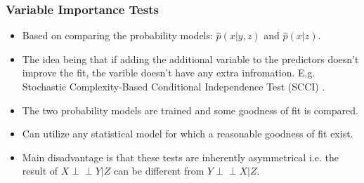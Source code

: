 \documentclass{beamer}
\def\ci{\perp\!\!\!\!\!\perp}
\begin{document}


\begin{frame}
	\frametitle{Variable Importance Tests}
	\begin{itemize}
		\setlength\itemsep{1em}
		\item Based on comparing the probability models: $\hat{p}(x |
			y, z) $ and $ \hat{p}(x | z) $. 
		\item The idea being that if adding the additional variable to
			the predictors doesn't improve the fit, the varible
			doesn't have any extra infromation.  E.g. Stochastic
			Complexity-Based Conditional Independence Test (SCCI)
			\footnotemark.
		\item The two probability models are trained and some goodness of fit is compared.
		\item Can utilize any statistical model for which a reasonable goodness
			of fit exist.
		\item Main disadvantage is that these tests are inherently
			asymmetrical i.e. the result of $ X \ci Y | Z $ can be
			different from $ Y \ci X | Z $.
	\end{itemize}

\end{frame}
\end{document}
